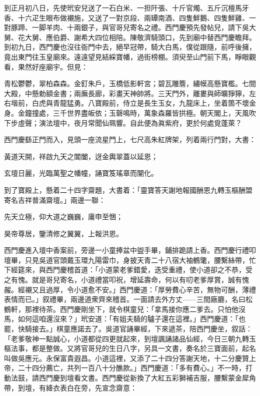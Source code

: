 到正月初八日，先使玳安兒送了一石白米、一担阡張、十斤官燭、五斤沉檀馬牙香、十六疋生眼布做襯施，又送了一對京段、兩罈南酒、四隻鮮鵝、四隻鮮雞、一對豚蹄、一脚羊肉、十兩銀子，與官哥兒寄名之禮。西門慶預先發帖兒，請下吳大舅、花大舅、應伯爵、謝希大四位相陪。陳敬濟騎頭口，先到廟中替西門慶瞻拜。到初九日，西門慶也沒往衙門中去，絕早冠帶，騎大白馬，僕從跟隨，前呼後擁，竟出東門往玉皇廟來。遠遠望見結綵寶幡，過街榜棚。須臾至山門前下馬，睜眼觀看，果然好座廟宇。但見：

\begin{myquote}
青松鬱鬱，翠柏森森。金釘朱戶，玉橋低影軒宮；碧瓦雕簷，繡幙高懸寶檻。七間大殿，中懸勅額金書；兩廡長廊，彩畫天神帥將。三天門外，離婁與師曠猙獰，左右堦前，白虎與青龍猛勇。八寶殿前，侍立是長生玉女，九龍床上，坐着箇不壞金身。金鐘撞處，三千世界盡皈依；玉磬鳴時，萬象森羅皆拱極。朝天閣上，天風吹下步虛聲；演法壇中，夜月常聞仙珮響。自此便為眞紫府，更於何處覓蓬萊？
\end{myquote}

西門慶繇正門而入，見頭一座流星門上，七尺高朱紅牌架，列着兩行門對，大書：

\begin{myquote}
黃道天開，祥啟九天之閶闔，迓金輿翠蓋以延恩；

玄壇日麗，光臨萬聖之幡幢，誦寶笈瑤章而闡化。
\end{myquote}

到了寶殿上，懸着二十四字齋題，大書着：「靈寶答天謝地報國酬恩九轉玉樞酬盟寄名吉祥普滿齋壇。」兩邊一聯：

\begin{myquote}
先天立極，仰大道之巍巍，庸申至悃；

昊帝尊居，鑒清修之翼翼，上報洪恩。
\end{myquote}

西門慶進入壇中香案前，旁邊一小童捧盆中盥手畢，鋪排跪請上香。西門慶行禮叩壇畢，只見吳道官頭戴玉環九陽雷巾，身披天青二十八宿大袖鶴氅，腰繫絲帶，忙下經筵來，與西門慶稽首道：「小道蒙老爹錯愛，迭受重禮，使小道卻之不恭，受之有愧。就是哥兒寄名，小道禮當叩祝，增延壽命，何以有叨老爹厚賞，誠有愧赧。經襯又且過厚，令小道愈不安。」西門慶道：「厚勞費心辛苦，無物可酬，薄禮表情而已。」叙禮畢，兩邊道衆齊來稽首。一面請去外方丈——三間廠廳，名曰松鶴軒，那裡待茶。西門慶剛坐下，就令棋童兒：「拿馬接你應二爹去。只怕他沒馬，如何這咱還沒來？」玳安道：「有姐夫騎的驢子還在這裡。」西門慶道：「也罷，快騎接去。」棋童應諾去了。吳道官誦畢經，下來遞茶，陪西門慶坐，叙話：「老爹敬神一點誠心，小道都從四更就起來，到壇諷誦諸品仙經，今日三朝九轉玉樞法事，都是整做。又將官哥兒的生日八字，另具一文書，奏名於三寶面前，起名叫做吳應元。永保富貴遐昌。小道這裡，又添了二十四分答謝天地，{}十二分慶贊上帝，二十四分薦亡，共列一百八十分醮款。」西門慶道：「多有費心。」不一時，打動法鼓，請西門慶到壇看文書。西門慶從新換了大紅五彩獅補吉服，腰繫蒙金犀角帶，到壇，有絳衣表白在旁，先宣念齋意：

